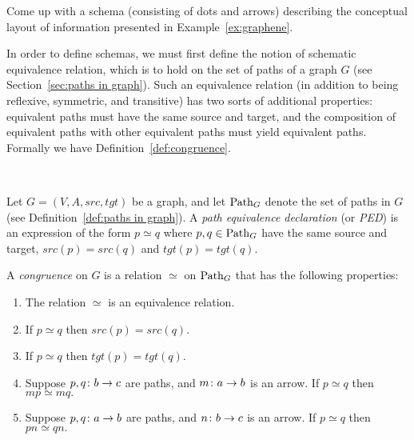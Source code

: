 \documentclass[../main/CT4S-EN-RU]{subfiles}
\begin{document}
\begin{exampleRUS}\label{ex:department store 3}
\end{exampleRUS}

\begin{exerciseENG}\label{exc:schema for first tables}
Come up with a schema (consisting of dots and arrows) describing the conceptual layout of information presented in Example~\ref{ex:graphene}. 
\end{exerciseENG}

\begin{exerciseRUS}\label{exc:schema for first tables}
\end{exerciseRUS}

\begin{blockENG}
In order to define schemas, we must first define the notion of schematic equivalence relation, which is to hold on the set of paths of a graph $G$ (see Section~\ref{sec:paths in graph}). Such an equivalence relation (in addition to being reflexive, symmetric, and transitive) has two sorts of additional properties: equivalent paths must have the same source and target, and the composition of equivalent paths with other equivalent paths must yield equivalent paths. Formally we have Definition~\ref{def:congruence}.
\end{blockENG}

\begin{blockRUS}
\end{blockRUS}

\begin{definitionENG}\label{def:congruence}\

Let $G=(V,A,src,tgt)$ be a graph, and let $\operatorname{Path}_G$ denote the set of paths in $G$ (see Definition~\ref{def:paths in graph}). A {\em path equivalence declaration} (or {\em PED}) is an expression of the form $p\simeq q$ where $p,q\in\operatorname{Path}_G$ have the same source and target, $src(p)=src(q)$ and $tgt(p)=tgt(q).$ 

A {\em congruence} on $G$ is a relation $\simeq$ on $\operatorname{Path}_G$ that has the following properties: 
\begin{enumerate}
\item The relation $\simeq$ is an equivalence relation.
\item If $p\simeq q$ then $src(p)=src(q).$
\item If $p\simeq q$ then $tgt(p)=tgt(q).$
\item Suppose $p,q\colon b\rightarrow c$ are paths, and $m\colon a\rightarrow b$ is an arrow. If $p\simeq q$ then $mp\simeq mq.$ 
\item Suppose $p,q\colon a\rightarrow b$ are paths, and $n\colon b\rightarrow c$ is an arrow. If $p\simeq q$ then $pn\simeq qn.$
\end{enumerate}
\end{definitionENG}
\end{document}
